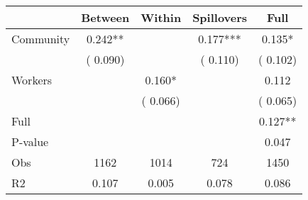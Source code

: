 
\begin{tabular}{l*{4}{c}}\hline&\multicolumn{1}{c}{Between}&\multicolumn{1}{c}{Within}&\multicolumn{1}{c}{Spillovers}&\multicolumn{1}{c}{Full}\\ \hline
 Community             &              0.242**      &                                               &        0.177*** &         0.135*                            \\ 
                               &        (       0.090)           &                                       &       (       0.110)     &      (       0.102)                                           \\ 
 Workers       &                                               &        0.160*    &                                &             0.112                            \\ 
                               &                                               & (       0.066)                  &                                        &      (       0.065)                                           \\ 
\hline                                                                                                                                                                                                                                            
 Full                  &                                               &                                               &                                        &             0.127**                                     \\ 
 P-value               &                                               &                                               &                                        &             0.047                                           \\ 
 Obs                   &               1162               &       1014                       &       724                &              1450                                               \\ 
 R2                    &                      0.107              &              0.005                      &              0.078               &                     0.086                                              \\ 
\hline \end{tabular}                                                                                                                                                                                                              